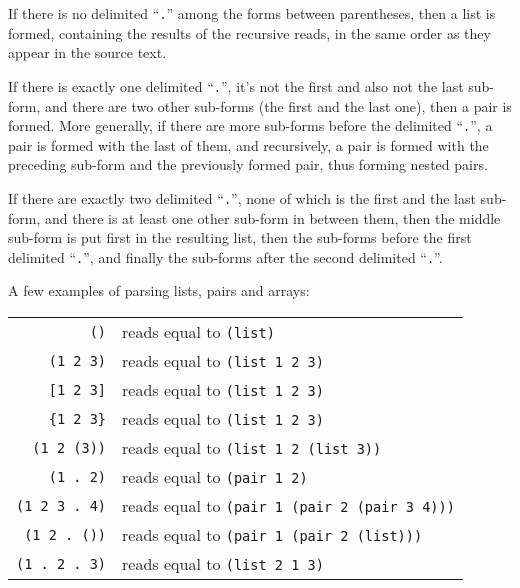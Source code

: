 If there is no delimited ``\lstinline!.!'' among the forms between parentheses, then a list is formed, containing the results of the recursive reads, in the same order as they appear in the source text.

If there is exactly one delimited ``\lstinline!.!'', it's not the first and also not the last sub-form, and there are two other sub-forms (the first and the last one), then a pair is formed. More generally, if there are more sub-forms before the delimited ``\lstinline!.!'', a pair is formed with the last of them, and recursively, a pair is formed with the preceding sub-form and the previously formed pair, thus forming nested pairs.

If there are exactly two delimited ``\lstinline!.!'', none of which is the first and the last sub-form, and there is at least one other sub-form in between them, then the middle sub-form is put first in the resulting list, then the sub-forms before the first delimited ``\lstinline!.!'', and finally the sub-forms after the second delimited ``\lstinline!.!''. 


\example A few examples of parsing lists, pairs and arrays:

\begin{tabular}{ r l }
  \lstinline!()! & reads equal to \lstinline!(list)! \\
  \lstinline!(1 2 3)! & reads equal to \lstinline!(list 1 2 3)! \\
  \lstinline![1 2 3]! & reads equal to \lstinline!(list 1 2 3)! \\
  \lstinline!{1 2 3}! & reads equal to \lstinline!(list 1 2 3)! \\
  \lstinline!(1 2 (3))! & reads equal to \lstinline!(list 1 2 (list 3))! \\
  \lstinline!(1 . 2)! & reads equal to \lstinline!(pair 1 2)! \\
  \lstinline!(1 2 3 . 4)! & reads equal to \lstinline!(pair 1 (pair 2 (pair 3 4)))! \\
  \lstinline!(1 2 . ())! & reads equal to \lstinline!(pair 1 (pair 2 (list)))! \\
  \lstinline!(1 . 2 . 3)! & reads equal to \lstinline!(list 2 1 3)! \\
\end{tabular}






